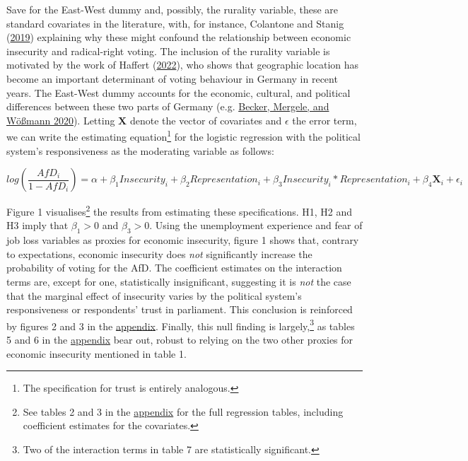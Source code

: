 \documentclass[
]{article}
\begin{document}
Save for the East-West dummy and, possibly, the rurality variable, these
are standard covariates in the literature, with, for instance, Colantone
and Stanig (\protect\hyperlink{ref-colantone_surge_2019}{2019})
explaining why these might confound the relationship between economic
insecurity and radical-right voting. The inclusion of the rurality
variable is motivated by the work of Haffert
(\protect\hyperlink{ref-haffert_stadt_2022}{2022}), who shows that
geographic location has become an important determinant of voting
behaviour in Germany in recent years. The East-West dummy accounts for
the economic, cultural, and political differences between these two
parts of Germany (e.g.
\protect\hyperlink{ref-becker_2020_separation}{Becker, Mergele, and
Wößmann 2020}). Letting \(\textbf{X}\) denote the vector of covariates
and \(\epsilon\) the error term, we can write the estimating
equation\footnote{The specification for trust is entirely analogous.}
for the logistic regression with the political system's responsiveness
as the moderating variable as follows:

\[
log(\frac{AfD_{i}}{1-AfD_{i}}) = \alpha + \beta_{1}Insecurity_{i} +  \beta_{2}Representation_{i} + \beta_{3}Insecurity_{i}*Representation_{i} + \beta_{4}\textbf{X}_{i} + \epsilon_{i}
\]

Figure 1 visualises\footnote{See tables 2 and 3 in the
  \protect\hyperlink{appendix}{appendix} for the full regression tables,
  including coefficient estimates for the covariates.} the results from
estimating these specifications. H1, H2 and H3 imply that
\(\beta_{1}>0\) and \(\beta_{3}>0\). Using the unemployment experience
and fear of job loss variables as proxies for economic insecurity,
figure 1 shows that, contrary to expectations, economic insecurity does
\emph{not} significantly increase the probability of voting for the AfD.
The coefficient estimates on the interaction terms are, except for one,
statistically insignificant, suggesting it is \emph{not} the case that
the marginal effect of insecurity varies by the political system's
responsiveness or respondents' trust in parliament. This conclusion is
reinforced by figures 2 and 3 in the
\protect\hyperlink{appendix}{appendix}. Finally, this null finding is
largely,\footnote{Two of the interaction terms in table 7 are
  statistically significant.} as tables 5 and 6 in the
\protect\hyperlink{appendix}{appendix} bear out, robust to relying on
the two other proxies for economic insecurity mentioned in table 1.
\end{document}
